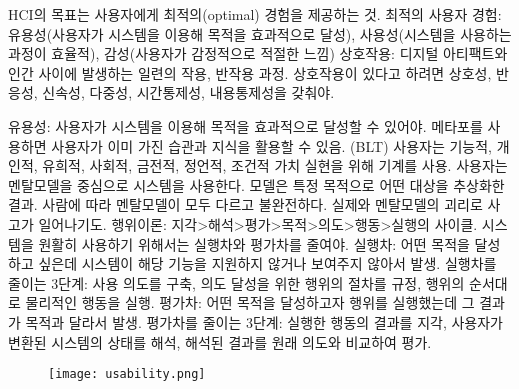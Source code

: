 
\bitmz
  \itm HCI의 목표는 사용자에게 최적의(optimal) 경험을 제공하는 것.
  \itm 최적의 사용자 경험: 유용성(사용자가 시스템을 이용해 목적을 효과적으로 달성), 사용성(시스템을 사용하는 과정이 효율적), 감성(사용자가 감정적으로 적절한 느낌)
  \itm 상호작용: 디지털 아티팩트와 인간 사이에 발생하는 일련의 작용, 반작용 과정. 상호작용이 있다고 하려면 상호성, 반응성, 신속성, 다중성, 시간통제성, 내용통제성을 갖춰야.
\eitmz


\bitmz
  \itm 유용성: 사용자가 시스템을 이용해 목적을 효과적으로 달성할 수 있어야.
  \itm 메타포를 사용하면 사용자가 이미 가진 습관과 지식을 활용할 수 있음. (BLT)
  \itm 사용자는 기능적, 개인적, 유희적, 사회적, 금전적, 정언적, 조건적 가치 실현을 위해 기계를 사용.
  \itm 사용자는 멘탈모델을 중심으로 시스템을 사용한다. 모델은 특정 목적으로 어떤 대상을 추상화한 결과. 사람에 따라 멘탈모델이 모두 다르고 불완전하다. 실제와 멘탈모델의 괴리로 사고가 일어나기도.
  \itm 행위이론: 지각>해석>평가>목적>의도>행동>실행의 사이클.
  \itm 시스템을 원활히 사용하기 위해서는 실행차와 평가차를 줄여야.
  \bitmz
    \itm 실행차: 어떤 목적을 달성하고 싶은데 시스템이 해당 기능을 지원하지 않거나 보여주지 않아서 발생.
    \itm 실행차를 줄이는 3단계: 사용 의도를 구축, 의도 달성을 위한 행위의 절차를 규정, 행위의 순서대로 물리적인 행동을 실행.
    \itm 평가차: 어떤 목적을 달성하고자 행위를 실행했는데 그 결과가 목적과 달라서 발생.
    \itm 평가차를 줄이는 3단계: 실행한 행동의 결과를 지각, 사용자가 변환된 시스템의 상태를 해석, 해석된 결과를 원래 의도와 비교하여 평가.
  \eitmz
\eitmz


\vspace{-3mm}
\begin{figure}[h] \centering \texttt{[image: usability.png]} \end{figure}
\vspace{-3mm}

